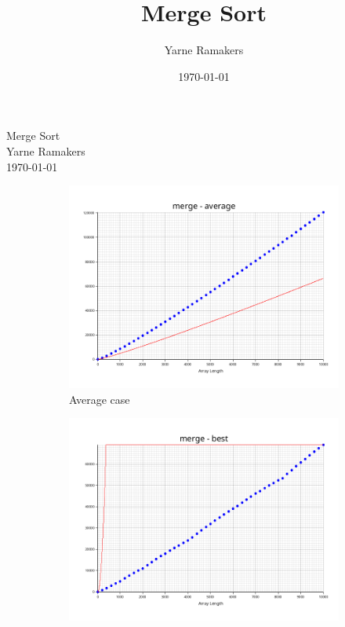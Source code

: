 \documentclass[a4paper]{article}
\title{Merge Sort}
\author{Yarne Ramakers}
\date{\today}
\begin{document}
\begin{center}
  Merge Sort \\
  Yarne Ramakers \\
  \today \\
\end{center}

\begin{figure}[h]
  \begin{subfigure}{0.3\textwidth}
    \includegraphics[width=\textwidth]{../plots/merge-average.png}
    \caption{Average case}
    \label{fig:merge-avg}
  \end{subfigure}
  \begin{subfigure}[b]{0.3\textwidth}
    \includegraphics[width=\textwidth]{../plots/merge-best.png}

\end{subfigure}
\end{figure}
\end{document}
